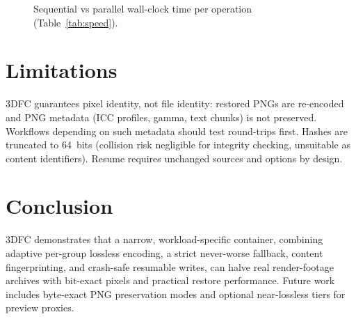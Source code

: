 \documentclass[11pt,a4paper]{article}
\begin{document}
\begin{figure}[h]
\centering
{}
\caption{Sequential vs parallel wall-clock time per operation
(Table~\ref{tab:speed}).}
\label{fig:speed}
\end{figure}

\section{Limitations}

3DFC guarantees pixel identity, not file identity: restored PNGs are
re-encoded and PNG metadata (ICC profiles, gamma, text chunks) is not
preserved. Workflows depending on such metadata should test round-trips first.
Hashes are truncated to 64~bits (collision risk negligible for integrity
checking, unsuitable as content identifiers). Resume requires unchanged
sources and options by design.

\section{Conclusion}

3DFC demonstrates that a narrow, workload-specific container, combining
adaptive per-group lossless encoding, a strict never-worse fallback,
content fingerprinting, and crash-safe resumable writes, can halve real
render-footage archives with bit-exact pixels and practical restore
performance. Future work includes byte-exact PNG preservation modes and
optional near-lossless tiers for preview proxies.
\end{document}

